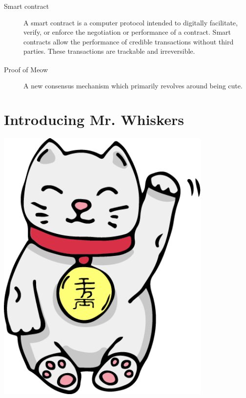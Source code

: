 \documentclass[9pt,oneside]{amsart}
\newenvironment{Figure}
  {\par\medskip\noindent\minipage{\linewidth}}
  {\endminipage\par\medskip}
\begin{document}
\begin{multicols}{2}
\begin{description}
    \item[Smart contract] A smart contract is a computer protocol intended to digitally facilitate, verify, or enforce the negotiation or performance of a contract. Smart contracts allow the performance of credible transactions without third parties. These transactions are trackable and irreversible.
    
    \item[Proof of Meow\textsuperscript{\textregistered}] A new consensus mechanism which primarily revolves around being cute.
\end{description}

\section{Introducing Mr. Whiskers}\label{sec:whiskers}
\begin{Figure}
    \medskip
    \centering
    \includegraphics[width=0.80\textwidth]{figures/mrwhiskers.png}
    \medskip
\end{Figure} 



\end{multicols}
\end{document}
